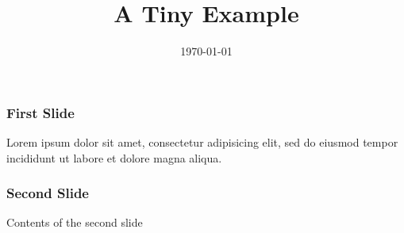 \documentclass{beamer}
\title{A Tiny Example}
\date{\today}
\begin{document}
 
\maketitle 
\begin{frame} 
\frametitle{First Slide} 
Lorem ipsum dolor sit amet, consectetur adipisicing elit, sed do eiusmod tempor incididunt ut labore et dolore magna aliqua. 
\end{frame} 
\begin{frame} 
\frametitle{Second Slide} 
Contents of the second slide 
\end{frame} 
\end{document}
